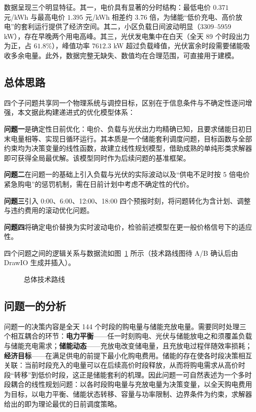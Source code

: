 \documentclass[zihao=-4,a4paper,UTF8,fontset=none]{ctexart}
\begin{document}
数据呈现三个明显特征。其一，电价具有显著的分时结构：最低电价 $0.371$ 元/kWh 与最高电价 $1.395$ 元/kWh 相差约 3.76 倍，为储能“低价充电、高价放电”的套利运行提供了经济空间。其二，小区负载日间波动明显（$3309$--$5959$ kW），存在早晚两个用电高峰。其三，光伏发电集中在白天（全天 89 个时段出力为正，占 $61.8\%$），峰值功率 $7612.3$ kW 超过负载峰值，光伏富余时段需要储能吸收多余电量。此外，数据完整无缺失、数值均在合理范围，可直接用于建模。

\subsection{总体思路}

四个子问题共享同一个物理系统与调控目标，区别在于信息条件与不确定性逐问增强，本文据此构建递进式的优化模型体系：

\textbf{问题一}是确定性日前优化：电价、负载与光伏出力均精确已知，且要求储能日初日末电量相等、实现日循环运行。其本质是一个储能套利调度问题，目标函数与全部约束均为决策变量的线性函数，故建立线性规划模型，借助成熟的单纯形类求解器即可获得全局最优解。该模型同时作为后续问题的基准框架。

\textbf{问题二}在问题一的基础上引入负载与光伏的实际波动以及“供电不足时按 5 倍电价紧急购电”的惩罚机制，需在日前计划中考虑不确定性的代价。

\textbf{问题三}引入 0:00、6:00、12:00、18:00 四个预报时刻，将问题转化为含计划、调整与违约费用的滚动优化问题。

\textbf{问题四}将确定电价替换为实时波动电价，检验前述模型在更一般价格信号下的适应性。

四个问题之间的逻辑关系与数据流如图~\ref{fig:roadmap} 所示（技术路线图待 A/B 确认后由 DrawIO 生成并插入）。

\begin{figure}[H]
  \centering
  \caption{总体技术路线}
  \label{fig:roadmap}
\end{figure}

\subsection{问题一的分析}

问题一的决策内容是全天 144 个时段的购电量与储能充放电量。需要同时处理三个相互耦合的环节：\textbf{电力平衡}——任一时刻购电、光伏与储能放电之和须覆盖负载与储能充电需求；\textbf{储能动态}——充放电改变储电量，且充放电过程伴随效率损耗；\textbf{经济目标}——在满足供电的前提下最小化购电费用。储能的存在使各时段决策相互关联：当前时段充入的电量可以在后续高价时段释放，从而将购电需求从高价时段“转移”到低价时段，这正是储能套利的机理。因此问题一可自然表述为一个多时段耦合的线性规划问题：以各时段购电量与充放电量为决策变量，以全天购电费用为目标，以电力平衡、储能状态转移、容量与功率限制、边界条件为约束，求解器给出的即为理论最优的日前调度策略。
\end{document}
